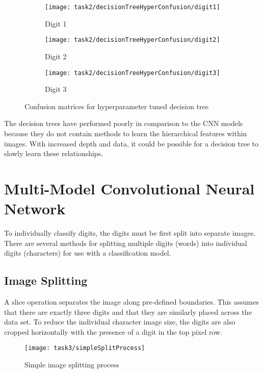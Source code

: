 \begin{figure}[!htbp]
    \centering
    \begin{subfigure}{0.3\textwidth}
        \texttt{[image: task2/decisionTreeHyperConfusion/digit1]}
        \caption{Digit 1}
        \label{fig:decisionTreeHyperConfusionMatrix1}
    \end{subfigure}
    \begin{subfigure}{0.3\textwidth}
        \texttt{[image: task2/decisionTreeHyperConfusion/digit2]}
        \caption{Digit 2}
        \label{fig:decisionTreeHyperConfusionMatrix2}
    \end{subfigure}
    \begin{subfigure}{0.3\textwidth}
        \texttt{[image: task2/decisionTreeHyperConfusion/digit3]}
        \caption{Digit 3}
        \label{fig:decisionTreeHyperConfusionMatrix3}
    \end{subfigure}
    \caption{Confusion matrices for hyperparameter tuned decision tree}
    \label{fig:decisionTreeHyperConfusionMatrix}
\end{figure}

The decision trees have performed poorly in comparison to the CNN models because they do not contain methods to learn the hierarchical features within images. With increased depth and data, it could be possible for a decision tree to slowly learn these relationships.

\pagebreak
\section{Multi-Model Convolutional Neural Network}

To individually classify digits, the digits must be first split into separate images. There are several methods for splitting multiple digits (words) into individual digits (characters) for use with a classification model.

\subsection{Image Splitting}
A slice operation separates the image along pre-defined boundaries. This assumes that there are exactly three digits and that they are similarly placed across the data set. To reduce the individual character image size, the digits are also cropped horizontally with the presence of a digit in the top pixel row.

\begin{figure}[!htbp]
    \centering
    \texttt{[image: task3/simpleSplitProcess]}
    \caption[Simple image splitting process]
    {Simple image splitting process}
    \label{fig:simpleSplitProcess}
\end{figure}

